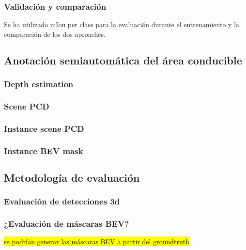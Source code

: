 \subsubsection{Validación y comparación}
Se ha utilizado mIou per class para la evaluación durante el entrenamiento y la comparación de los dos aproaches.


\subsection{Anotación semiautomática del área conducible}
\label{aplicacion}

\subsubsection{Depth estimation}
\subsubsection{Scene PCD}
\subsubsection{Instance scene PCD}
\subsubsection{Instance BEV mask}

\subsection{Metodología de evaluación}
\label{evaluacion}

\subsubsection{Evaluación de detecciones 3d}
\subsubsection{¿Evaluación de máscaras BEV?}
\hl{se podrían generar las máscaras BEV a partir del groundtruth}


